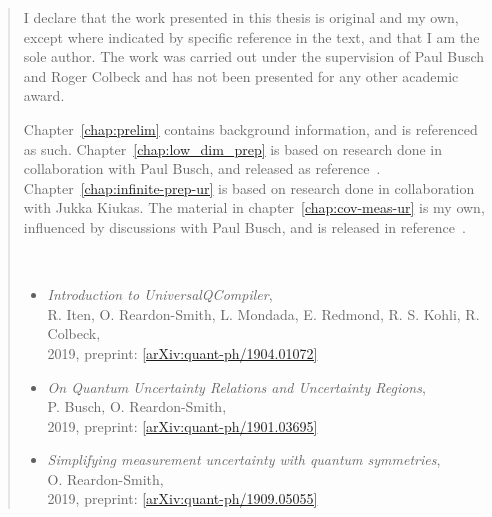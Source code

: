 \begin{SingleSpace}
\begin{quote}

I declare that the work presented in this thesis is original and my own, except where indicated by specific reference in the text, and that I am the sole author. The work was carried out under the supervision of Paul Busch and Roger Colbeck and has not been presented for any other academic award.

Chapter~\ref{chap:prelim} contains background information, and is referenced as such. Chapter~\ref{chap:low_dim_prep} is based on research done in collaboration with Paul Busch, and released as reference~\cite{pb-ors-u-regions-u-relations}. Chapter~\ref{chap:infinite-prep-ur} is based on research done in collaboration with Jukka Kiukas. The material in chapter~\ref{chap:cov-meas-ur} is my own, influenced by discussions with Paul Busch, and is released in reference~\cite{ors-simplifying-meas-ur}. 

\bigskip

\bigskip

\bigskip

\bigskip

\bigskip

\\

\begin{itemize}
\item {\em Introduction to UniversalQCompiler}, \\ R. Iten, O. Reardon-Smith, L. Mondada, E. Redmond, R. S. Kohli, R. Colbeck, \\2019, preprint: \href{https://arxiv.org/abs/1904.01072}{[arXiv:quant-ph/1904.01072]}
\item {\em On Quantum Uncertainty Relations and Uncertainty Regions}, \\P. Busch, O. Reardon-Smith, \\2019, preprint: \href{https://arxiv.org/abs/1901.03695}{[arXiv:quant-ph/1901.03695]}
\item {\em Simplifying measurement uncertainty with quantum symmetries}, \\ O. Reardon-Smith, \\2019, preprint: \href{https://arxiv.org/abs/1909.05055}{[arXiv:quant-ph/1909.05055]}
\end{itemize}


\end{quote}
\end{SingleSpace}
\clearpage